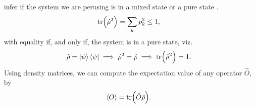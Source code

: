         infer if the system we are perusing is in a mixed state or a pure state
        \cite{modern-qm}.
        \begin{align}
            \tr(\hat{\rho}^2) = \sum_{k} p_k^2 \leq 1,
        \end{align}
        with equality if, and only if, the system is in a pure state, viz.
        \begin{align}
            \hat{\rho} = \ket{\psi}\bra{\psi}
            \implies \hat{\rho}^2 = \hat{\rho}
            \implies \tr(\hat{\rho}^2) = 1.
        \end{align}
        Using density matrices, we can compute the expectation value of any
        operator $\hat{O}$, by \cite{modern-qm}
        \begin{align}
            \expval{O} = \tr(\hat{O}\hat{\rho}).
        \end{align}

